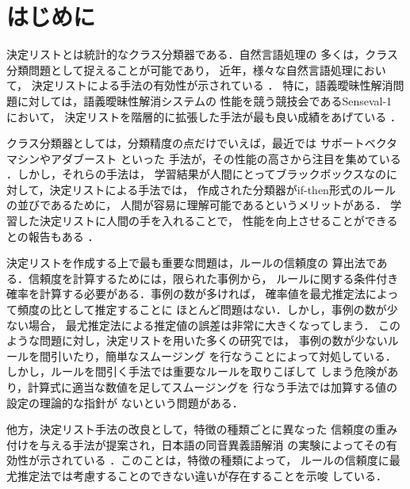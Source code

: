 

\maketitle




\section{はじめに}

決定リストとは統計的なクラス分類器である．自然言語処理の
多くは，クラス分類問題として捉えることが可能であり，
近年，様々な自然言語処理において，
決定リストによる手法の有効性が示されている
\cite{Yarowsky:unsupervised,新納:日本語形態素解析,宇津呂:コーパス,白木:複数決定リスト}．
特に，語義曖昧性解消問題に対しては，語義曖昧性解消システムの
性能を競う競技会であるSenseval-1 において，
決定リストを階層的に拡張した手法が最も良い成績をあげている
\cite{Yarowsky:Hierarchical}．

クラス分類器としては，分類精度の点だけでいえば，最近では
サポートベクタマシン\cite{vapnik95nature}やアダブースト\cite{freund99short}
といった
手法が，その性能の高さから注目を集めている\cite{nagata01text}
．しかし，それらの手法は，
学習結果が人間にとってブラックボックスなのに対して，決定リストによる手法では，
作成された分類器がif-then形式のルールの並びであるために，
人間が容易に理解可能であるというメリットがある．
学習した決定リストに人間の手を入れることで，
性能を向上させることができるとの報告もある \cite{Li:Text}．

決定リストを作成する上で最も重要な問題は，ルールの信頼度の
算出法である．信頼度を計算するためには，限られた事例から，
ルールに関する条件付き確率を計算する必要がある．事例の数が多ければ，
確率値を最尤推定法によって頻度の比として推定することに
ほとんど問題はない．しかし，事例の数が少ない場合，
最尤推定法による推定値の誤差は非常に大きくなってしまう．
このような問題に対し，決定リストを用いた多くの研究では，
事例の数が少ないルールを間引いたり，簡単なスムージング
を行なうことによって対処している．
しかし，ルールを間引く手法では重要なルールを取りこぼして
しまう危険があり，計算式に適当な数値を足してスムージングを
行なう手法では加算する値の設定の理論的な指針が
ないという問題がある．

他方，決定リスト手法の改良として，特徴の種類ごとに異なった
信頼度の重み付けを与える手法が提案され，日本語の同音異義語解消
の実験によってその有効性が示されている\cite{新納:複合語}
．このことは，特徴の種類によって，
ルールの信頼度に最尤推定法では考慮することのできない違いが存在することを示唆
している．

